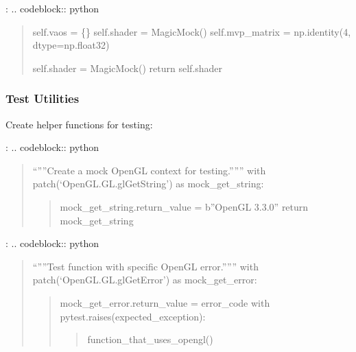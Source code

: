 \documentclass[a4paper,10pt,english,openany,oneside]{sphinxmanual}
\begin{document}
\sphinxAtStartPar
{}:
.. code\sphinxhyphen{}block:: python
\begin{quote}
\begin{description}
\begin{description}
\sphinxAtStartPar
self.vaos = \{\}
self.shader = MagicMock()
self.mvp\_matrix = np.identity(4, dtype=np.float32)

\sphinxAtStartPar
self.shader = MagicMock()
return self.shader

\end{description}

\end{description}
\end{quote}


\subsubsection{Test Utilities}
\label{\detokenize{testing:test-utilities}}
\sphinxAtStartPar
Create helper functions for testing:

\sphinxAtStartPar
{}:
.. code\sphinxhyphen{}block:: python
\begin{quote}
\begin{description}
\sphinxAtStartPar
“””Create a mock OpenGL context for testing.”””
with patch(‘OpenGL.GL.glGetString’) as mock\_get\_string:
\begin{quote}

\sphinxAtStartPar
mock\_get\_string.return\_value = b”OpenGL 3.3.0”
return mock\_get\_string
\end{quote}

\end{description}
\end{quote}

\sphinxAtStartPar
{}:
.. code\sphinxhyphen{}block:: python
\begin{quote}
\begin{description}
\sphinxAtStartPar
“””Test function with specific OpenGL error.”””
with patch(‘OpenGL.GL.glGetError’) as mock\_get\_error:
\begin{quote}

\sphinxAtStartPar
mock\_get\_error.return\_value = error\_code
with pytest.raises(expected\_exception):
\begin{quote}

\sphinxAtStartPar
function\_that\_uses\_opengl()
\end{quote}
\end{quote}

\end{description}
\end{quote}
\end{document}
